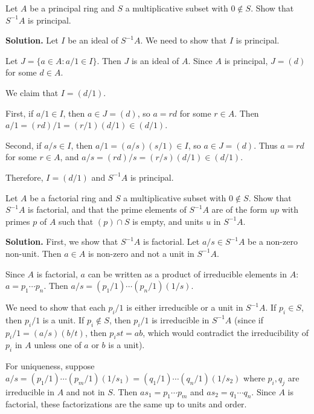\begin{problembox}
Let $A$ be a principal ring and $S$ a multiplicative subset with $0 \notin S$. Show that $S^{-1}A$ is principal.
\end{problembox}

\noindent\textbf{Solution.}
Let $I$ be an ideal of $S^{-1}A$. We need to show that $I$ is principal.

Let $J = \{a \in A : a/1 \in I\}$. Then $J$ is an ideal of $A$. Since $A$ is principal, $J = (d)$ for some $d \in A$.

We claim that $I = (d/1)$. 

First, if $a/1 \in I$, then $a \in J = (d)$, so $a = rd$ for some $r \in A$. Then $a/1 = (rd)/1 = (r/1)(d/1) \in (d/1)$.

Second, if $a/s \in I$, then $a/1 = (a/s)(s/1) \in I$, so $a \in J = (d)$. Thus $a = rd$ for some $r \in A$, and $a/s = (rd)/s = (r/s)(d/1) \in (d/1)$.

Therefore, $I = (d/1)$ and $S^{-1}A$ is principal.

\begin{problembox}
Let $A$ be a factorial ring and $S$ a multiplicative subset with $0 \notin S$. Show that $S^{-1}A$ is factorial, and that the prime elements of $S^{-1}A$ are of the form $up$ with primes $p$ of $A$ such that $(p) \cap S$ is empty, and units $u$ in $S^{-1}A$.
\end{problembox}

\noindent\textbf{Solution.}
First, we show that $S^{-1}A$ is factorial. Let $a/s \in S^{-1}A$ be a non-zero non-unit. Then $a \in A$ is non-zero and not a unit in $S^{-1}A$.

Since $A$ is factorial, $a$ can be written as a product of irreducible elements in $A$: $a = p_1 \cdots p_n$. Then $a/s = (p_1/1) \cdots (p_n/1)(1/s)$.

We need to show that each $p_i/1$ is either irreducible or a unit in $S^{-1}A$. If $p_i \in S$, then $p_i/1$ is a unit. If $p_i \notin S$, then $p_i/1$ is irreducible in $S^{-1}A$ (since if $p_i/1 = (a/s)(b/t)$, then $p_i st = ab$, which would contradict the irreducibility of $p_i$ in $A$ unless one of $a$ or $b$ is a unit).

For uniqueness, suppose $a/s = (p_1/1) \cdots (p_m/1)(1/s_1) = (q_1/1) \cdots (q_n/1)(1/s_2)$ where $p_i, q_j$ are irreducible in $A$ and not in $S$. Then $a s_1 = p_1 \cdots p_m$ and $a s_2 = q_1 \cdots q_n$. Since $A$ is factorial, these factorizations are the same up to units and order.

